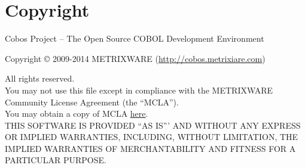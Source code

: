 \section*{Copyright}


Cobos Project -- The Open Source COBOL Development Environment

Copyright \copyright { 2009-2014 METRIXWARE }(\href{http://cobos.metrixware.com}{http://cobos.metrixiare.com})

All rights reserved.
\\

You may not use this file except in compliance with the METRIXWARE Community License Agreement (the ``MCLA'').
\\

You may obtain a copy of MCLA \href{http://cobos.metrixware.com/data-corner/cobos-license-mcla-opensource/}{here}.
\\

THIS SOFTWARE IS PROVIDED ``AS IS''' AND WITHOUT ANY EXPRESS OR IMPLIED WARRANTIES, INCLUDING,  WITHOUT LIMITATION, THE IMPLIED WARRANTIES OF MERCHANTABILITY AND FITNESS FOR A PARTICULAR PURPOSE.

